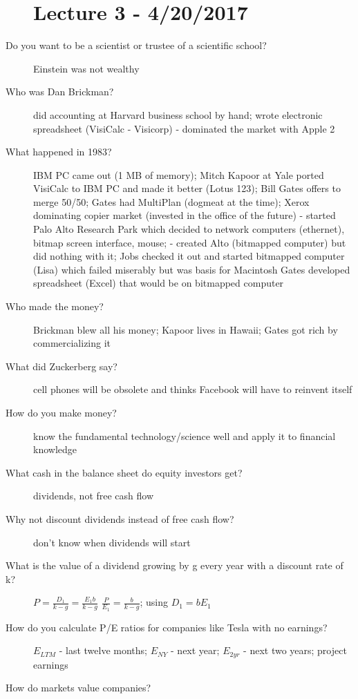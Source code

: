 \documentclass[11pt]{article}
\begin{document}
\begin{description}
\section{Lecture 3 - 4/20/2017}
\item[Do you want to be a scientist or trustee of a scientific school?]
  Einstein was not wealthy
\item[Who was Dan Brickman?]
  did accounting at Harvard business school by hand;
  wrote electronic spreadsheet (VisiCalc - Visicorp) - dominated the market with Apple 2
\item[What happened in 1983?]
  IBM PC came out (1 MB of memory);
  Mitch Kapoor at Yale ported VisiCalc to IBM PC and made it better (Lotus 123);
  Bill Gates offers to merge 50/50;
  Gates had MultiPlan (dogmeat at the time);
  Xerox dominating copier market (invested in the office of the future)
    - started Palo Alto Research Park which decided to network computers (ethernet), bitmap screen interface, mouse;
    - created Alto (bitmapped computer) but did nothing with it; Jobs checked it out and started bitmapped computer (Lisa) which failed miserably but was basis for Macintosh
  Gates developed spreadsheet (Excel) that would be on bitmapped computer
\item[Who made the money?]
  Brickman blew all his money;
  Kapoor lives in Hawaii;
  Gates got rich by commercializing it
\item[What did Zuckerberg say?]
  cell phones will be obsolete and thinks Facebook will have to reinvent itself
\item[How do you make money?]
  know the fundamental technology/science well and apply it to financial knowledge
\item[What cash in the balance sheet do equity investors get?]
  dividends, not free cash flow
\item[Why not discount dividends instead of free cash flow?]
  don't know when dividends will start
\item[What is the value of a dividend growing by g every year with a discount rate of k?]
  $P = \frac{D_1}{k - g} = \frac{E_1b}{k - g}$ \rightarrow $\frac{P}{E_1} = \frac{b}{k - g}$;
  using $D_1 = bE_1$
\item[How do you calculate P/E ratios for companies like Tesla with no earnings?]
  $E_{LTM}$ - last twelve  months;
  $E_{NY}$ - next year;
  $E_{2yr}$ - next two years;
  project earnings
\item[How do markets value companies?]

\end{description}
\end{document}
